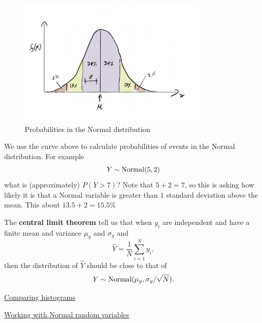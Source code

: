\begin{figure}[h]
\centering
\includegraphics[width=0.8\textwidth]{bellcurve}
\caption{Probabilities in the Normal distribution}\label{fig:bellcurve}
\end{figure}

We use the curve above to calculate probabilities of events in the Normal distribution. For example 
\begin{equation}
Y \sim {\rm Normal}(5,2)
\end{equation}
what is (approximately) $P(Y > 7)$? Note that $5 + 2 =  7$, so this is asking how likely it is that a Normal variable is greater than $1$ standard deviation above the mean. This about $13.5+2 = 15.5\%$%


The {\bf central limit theorem} tell us that when $y_i$ are independent and have a finite mean and variance $\mu_y$ and $\sigma_y$ and
\begin{equation}
 \hat{Y} = \frac{1}{N}\sum_{i=1}^Ny_i,
\end{equation}
then the distribution of $\hat{Y}$ should be close to that of
\begin{equation}
Y \sim {\rm Normal}(\mu_y,\sigma_y/\sqrt{N}).
\end{equation}




\begin{example}
\href{https://colab.research.google.com/drive/1PPFwE4GUzsr707s3mPhGRs7-TYlHxND2#scrollTo=qDKKEAeJXm87&line=1&uniqifier=1}{Comparing histograms}
\end{example}






\begin{example}
\href{https://colab.research.google.com/drive/1PPFwE4GUzsr707s3mPhGRs7-TYlHxND2#scrollTo=x23tWXiaxT7B&line=1&uniqifier=1}{Working with Normal random variables}
\end{example}


